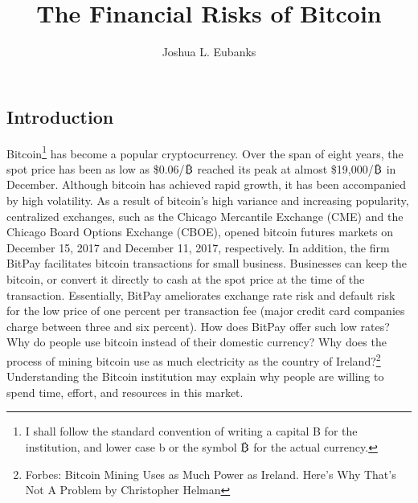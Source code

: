 \documentclass{paper}
\def\bitcoin{%
  \leavevmode
  \vtop{\offinterlineskip %
    \setbox0=\hbox{B}%
    \setbox2=\hbox to\wd0{\hfil\hskip-.03em
    \vrule height .3ex width .15ex\hskip .08em
    \vrule height .3ex width .15ex\hfil}
    \vbox{\copy2\box0}\box2}}
\begin{document}
\title{The Financial Risks of Bitcoin}
\author{Joshua L. Eubanks}
\maketitle
    \begin{doublespacing}

\section{Introduction}
Bitcoin\footnote{I shall follow the standard convention of writing a capital B for the institution, and lower case b or the symbol $\bitcoin$ for the actual currency.} has become a popular cryptocurrency. Over the span of eight years, the spot price has been as low as \$0.06/$\bitcoin$ reached its peak at almost \$19,000/$\bitcoin$ in December. Although bitcoin has achieved rapid growth, it has been accompanied by high volatility. As a result of bitcoin's high variance and increasing popularity, centralized exchanges, such as the Chicago Mercantile Exchange (CME) and the Chicago Board Options Exchange (CBOE), opened bitcoin futures markets on December 15, 2017 and December 11, 2017, respectively. In addition, the firm BitPay facilitates bitcoin transactions for small business. Businesses can keep the bitcoin, or convert it directly to cash at the spot price at the time of the transaction. Essentially, BitPay ameliorates exchange rate risk and default risk for the low price of one percent per transaction fee (major credit card companies charge between three and six percent). How does BitPay offer such low rates? Why do people use bitcoin instead of their domestic currency? Why does the process of mining bitcoin use as much electricity as the country of Ireland?\footnote{Forbes: Bitcoin Mining Uses as Much Power as Ireland. Here's Why That's Not A Problem by Christopher Helman} Understanding the Bitcoin institution may explain why people are willing to spend time, effort, and resources in this market.


\end{doublespacing}
\end{document}
